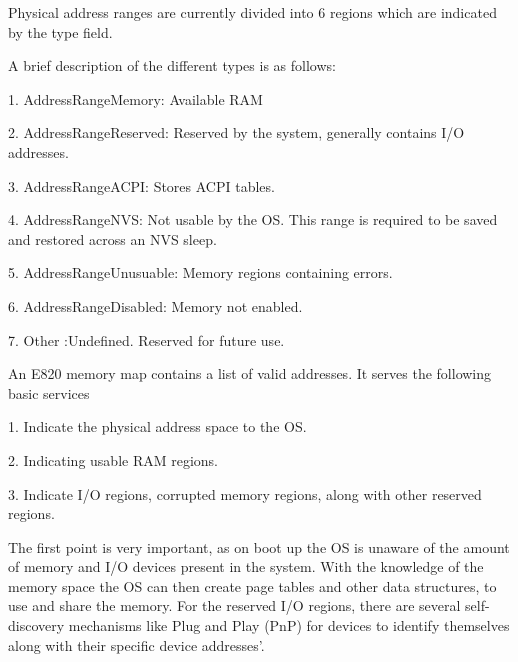 Physical address ranges are currently divided into 6 regions which are indicated by the type field.

A brief description of the different types is as follows:

1. AddressRangeMemory: Available RAM

2. AddressRangeReserved: Reserved by the system, generally contains I/O addresses.

3. AddressRangeACPI: Stores ACPI tables.

4. AddressRangeNVS: Not usable by the OS. This range is required to be saved and restored across an NVS sleep.

5. AddressRangeUnusuable: Memory regions containing errors.

6. AddressRangeDisabled: Memory not enabled.

7. Other :Undefined. Reserved for future use.

An E820 memory map contains a list of valid addresses. It serves the following basic services

1. Indicate the physical address space to the OS.

2. Indicating usable RAM regions.

3. Indicate I/O regions, corrupted memory regions, along with other reserved regions.

The first point is very important, as on boot up the OS is unaware of the amount of memory and I/O devices present in the system. With the knowledge of the memory space the OS can then create page tables and other data structures, to use and share the memory. For the reserved I/O regions, there are several self-discovery mechanisms like Plug and Play (PnP) for devices to identify themselves along with their specific device addresses’. 


